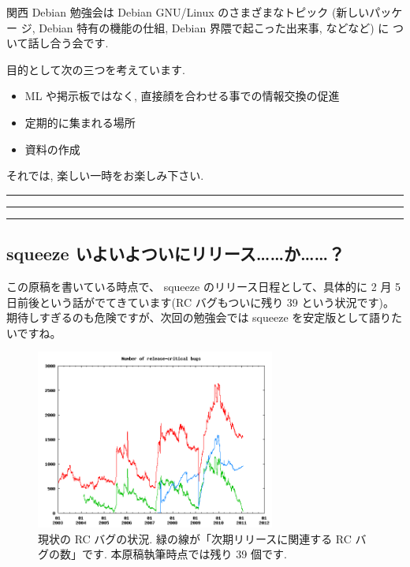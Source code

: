 \documentclass[mingoth,a4paper]{jsarticle}
\begin{document}
関西 Debian 勉強会は Debian GNU/Linux のさまざまなトピック (新しいパッケー
ジ, Debian 特有の機能の仕組, Debian 界隈で起こった出来事, などなど) に
ついて話し合う会です.

目的として次の三つを考えています.
\begin{itemize}
      \item ML や掲示板ではなく, 直接顔を合わせる事での情報交換の促進
      \item 定期的に集まれる場所
      \item 資料の作成
\end{itemize}

それでは, 楽しい一時をお楽しみ下さい.

\clearpage

\begin{minipage}[b]{0.2\hsize}
 {}
\end{minipage}
\begin{minipage}[b]{0.8\hsize}
\hrule
\vspace{2mm}
\hrule
\setcounter{tocdepth}{1}
\tableofcontents
\vspace{2mm}
\hrule
\end{minipage}


\subsection{squeeze いよいよついにリリース……か……？}
この原稿を書いている時点で、
squeeze のリリース日程として、具体的に 2 月 5 日前後という話がでてきています(RC バグもついに残り 39 という状況です)。
期待しすぎるのも危険ですが、次回の勉強会では squeeze を安定版として語りたいですね。
\begin{figure}[h!]
  \centering
  \includegraphics[width=0.7\textwidth]{./image201101/rc-status-20110123.png}
  \caption{現状の RC バグの状況. 緑の線が「次期リリースに関連する RC バグの数」です. 本原稿執筆時点では残り 39 個です.}
\end{figure}
\end{document}
